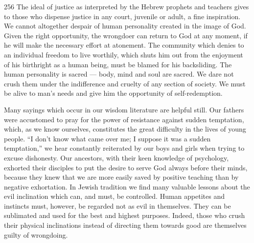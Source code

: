 \begin{tp}{256}
The ideal of justice as interpreted by the Hebrew
prophets and teachers gives to those who dispense justice
in any court, juvenile or adult, a fine inspiration. We
cannot altogether despair of human personality created
in the image of God. Given the right opportunity, the
wrongdoer can return to God at any moment, if he will
make the necessary effort at atonement. The community
which denies to an individual freedom to live worthily,
which shuts him out from the enjoyment of his birthright
as a human being, must be blamed for his backsliding.
The human personality is sacred — body, mind and soul
are sacred. We dare not crush them under the indifference
and cruelty of any section of society. We must be
alive to man’s needs and give him the opportunity of
self-redemption.
\end{tp}

Many sayings which occur in our wisdom literature
are helpful still. Our fathers were accustomed
to pray for the power of resistance against sudden
temptation, which, as we know ourselves, constitutes
the great difficulty in the lives of young people. “I don’t
know what came over me; I suppose it was a sudden
temptation,” we hear constantly reiterated by our boys
and girls when trying to excuse dishonesty. Our
ancestors, with their keen knowledge of psychology,
exhorted their disciples to put the desire to serve God
always before their minds, because they knew that we
are more easily saved by positive teaching than by
negative exhortation. In Jewish tradition we find many
valuable lessons about the evil inclination which can,
and must, be controlled. Human appetites and instincts
must, however, be regarded not as evil in themselves.
They can be sublimated and used for the best and highest
purposes. Indeed, those who crush their physical
inclinations instead of directing them towards good are
themselves guilty of wrongdoing.

